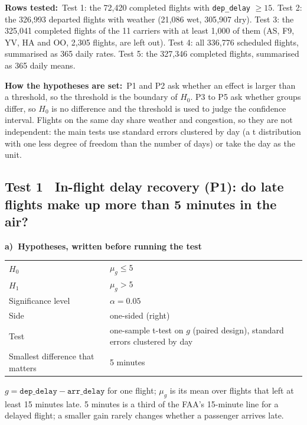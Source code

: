 \documentclass[10pt,a4paper,twocolumn]{article}
\newcommand{\eg}[1]{\textcolor{eg}{#1}}
\newcommand{\egblock}[1]{{\color{eg}#1\par}}
\newcommand{\field}[2]{\textbf{#1}~\eg{#2}\par}
\newcommand{\tpart}[2]{\par\needspace{12\baselineskip}\smallskip\textbf{#1)~#2}\par}
\newcommand{\code}[1]{\texttt{#1}}
\begin{document}
\field{Rows tested:}{Test 1: the 72{,}420 completed flights with \code{dep\_delay} $\ge15$.
Test 2: the 326{,}993 departed flights with weather (21{,}086 wet, 305{,}907 dry). Test 3: the
325{,}041 completed flights of the 11 carriers with at least 1{,}000 of them (AS, F9, YV, HA and
OO, 2{,}305 flights, are left out). Test 4: all 336{,}776 scheduled flights, summarised as 365
daily rates. Test 5: the 327{,}346 completed flights, summarised as 365 daily means.}

\field{How the hypotheses are set:}{P1 and P2 ask whether an effect is larger than a threshold,
so the threshold is the boundary of $H_0$. P3 to P5 ask whether groups differ, so $H_0$ is no
difference and the threshold is used to judge the confidence interval. Flights on the same day
share weather and congestion, so they are not independent: the main tests use standard errors
clustered by day (a t distribution with one less degree of freedom than the number of days) or
take the day as the unit.}

\subsection*{Test 1 \textbullet\ In-flight delay recovery (P1): do late flights make up more than
5 minutes in the air?}

\tpart{a}{Hypotheses, written before running the test}
{\small
\begin{tabularx}{\linewidth}{@{}K{3.4cm} Y@{}}
\toprule
$H_0$ & $\mu_g\le5$ \\
$H_1$ & $\mu_g>5$ \\
Significance level & $\alpha=0.05$ \\
Side & one-sided (right) \\
Test & one-sample t-test on $g$ (paired design), standard errors clustered by day \\
Smallest difference that matters & 5 minutes \\
\bottomrule
\end{tabularx}}

\egblock{$g=\code{dep\_delay}-\code{arr\_delay}$ for one flight; $\mu_g$ is its mean over
flights that left at least 15 minutes late. 5 minutes is a third of the FAA's 15-minute line for a
delayed flight; a smaller gain rarely changes whether a passenger arrives late.}
\end{document}
